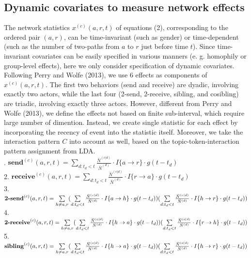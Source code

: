 \documentclass[a4paper]{article}
\begin{document}
\subsection{Dynamic covariates to measure network effects}
The network statistics $x^{(c)}(a, r, t)$ of equations (2), corresponding to the ordered pair $(a, r)$, can be time-invariant (such as gender) or time-dependent (such as the number of two-paths from $a$ to $r$ just before time $t$). Since time-invariant covariates can be easily specified in various manners (e. g. homophily or group-level effects), here we only consider specification of dynamic covariates.\\ \newline
Following Perry and Wolfe (2013), we use 6 effects as components of $x^{(c)}(a, r, t)$. The first two behaviors (send and receive) are dyadic, involving exactly two actors,
while the last four (2-send, 2-receive, sibling, and cosibling) are triadic, involving exactly three actors. However, different from Perry and Wolfe (2013), we define the effects not based on finite sub-interval, which require large number of dimention. Instead, we create single statistic for each effect by incorporating the recency of event into the statistic itself. Moreover, we take the interaction pattern $C$ into account as well, based on the topic-token-interaction pattern assignment from LDA. \\ . $\textbf{send}^{(c)}(a, r, t)=\sum\limits_{d: t_d<t} \frac{\bar N^{(c|d)}}{\bar N^{(d)}}\cdot I\{a\rightarrow r\}\cdot g(t-t_d)$\\
2. $\textbf{receive}^{(c)}(a, r, t)=\sum\limits_{d: t_d<t} \frac{\bar N^{(c|d)}}{\bar N^{(d)}}\cdot I\{r\rightarrow a\}\cdot g(t-t_d)$\\
3. $\textbf{2-send}^{(c)}(a, r, t)=\sum\limits_{h \neq a, r}\Large(\sum\limits_{d: t_d<t} \frac{\bar N^{(c|d)}}{\bar N^{(d)}}\cdot I\{a\rightarrow h\}\cdot g(t-t_d)\Large)\Large(\sum\limits_{d: t_d<t} \frac{\bar N^{(c|d)}}{\bar N^{(d)}}\cdot I\{h\rightarrow r\}\cdot g(t-t_d)\Large)$\\
4. $\textbf{2-receive}^{(c)}(a, r, t)=\sum\limits_{h \neq a, r}\Large(\sum\limits_{d: t_d<t} \frac{\bar N^{(c|d)}}{\bar N^{(d)}}\cdot I\{h\rightarrow a\}\cdot g(t-t_d)\Large)\Large(\sum\limits_{d: t_d<t} \frac{\bar N^{(c|d)}}{\bar N^{(d)}}\cdot I\{r\rightarrow h\}\cdot g(t-t_d)\Large)$\\
5. $\textbf{sibling}^{(c)}(a, r, t)=\sum\limits_{h \neq a, r}\Large(\sum\limits_{d: t_d<t} \frac{\bar N^{(c|d)}}{\bar N^{(d)}}\cdot I\{h\rightarrow a\}\cdot g(t-t_d)\Large)\Large(\sum\limits_{d: t_d<t} \frac{\bar N^{(c|d)}}{\bar N^{(d)}}\cdot I\{h\rightarrow r\}\cdot g(t-t_d)\Large)$\\
\end{document}
